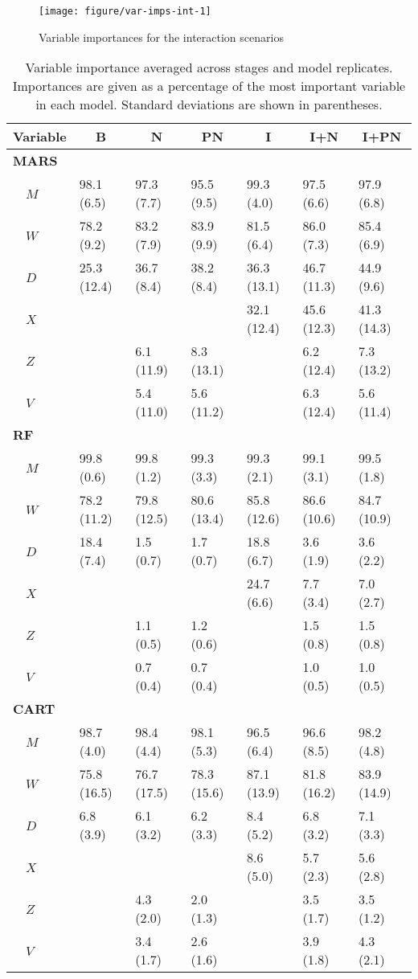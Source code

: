 \documentclass[12pt]{article}
\begin{document}
\begin{figure}[!htbp]
{\centering 
\texttt{[image: figure/var-imps-int-1]}
}
\caption[Variable importances for interaction scenarios]{Variable importances for the interaction scenarios}\label{fig:var-imps-int}
\end{figure}


\begin{table}[!htbp]
\caption[Variable importance averaged across stages and model replicates]{Variable importance averaged across stages and model replicates. Importances are given as a percentage of the most important variable in each model. Standard deviations are shown in parentheses.\label{tab:imp}} 
\begin{center}
\begin{tabular}{lllllll}
\toprule
\multicolumn{1}{l}{Variable}&\multicolumn{1}{c}{B}&\multicolumn{1}{c}{N}&\multicolumn{1}{c}{PN}&\multicolumn{1}{c}{I}&\multicolumn{1}{c}{I+N}&\multicolumn{1}{c}{I+PN}\tabularnewline
\midrule
{\bfseries MARS}&&&&&&\tabularnewline
~~$M$&98.1 (6.5)&97.3 (7.7)&95.5 (9.5)&99.3 (4.0)&97.5 (6.6)&97.9 (6.8)\tabularnewline
~~$W$&78.2 (9.2)&83.2 (7.9)&83.9 (9.9)&81.5 (6.4)&86.0 (7.3)&85.4 (6.9)\tabularnewline
~~$D$&25.3 (12.4)&36.7 (8.4)&38.2 (8.4)&36.3 (13.1)&46.7 (11.3)&44.9 (9.6)\tabularnewline
~~$X$&&&&32.1 (12.4)&45.6 (12.3)&41.3 (14.3)\tabularnewline
~~$Z$&&6.1 (11.9)&8.3 (13.1)&&6.2 (12.4)&7.3 (13.2)\tabularnewline
~~$V$&&5.4 (11.0)&5.6 (11.2)&&6.3 (12.4)&5.6 (11.4)\tabularnewline
\midrule
{\bfseries RF}&&&&&&\tabularnewline
~~$M$&99.8 (0.6)&99.8 (1.2)&99.3 (3.3)&99.3 (2.1)&99.1 (3.1)&99.5 (1.8)\tabularnewline
~~$W$&78.2 (11.2)&79.8 (12.5)&80.6 (13.4)&85.8 (12.6)&86.6 (10.6)&84.7 (10.9)\tabularnewline
~~$D$&18.4 (7.4)&1.5 (0.7)&1.7 (0.7)&18.8 (6.7)&3.6 (1.9)&3.6 (2.2)\tabularnewline
~~$X$&&&&24.7 (6.6)&7.7 (3.4)&7.0 (2.7)\tabularnewline
~~$Z$&&1.1 (0.5)&1.2 (0.6)&&1.5 (0.8)&1.5 (0.8)\tabularnewline
~~$V$&&0.7 (0.4)&0.7 (0.4)&&1.0 (0.5)&1.0 (0.5)\tabularnewline
\midrule
{\bfseries CART}&&&&&&\tabularnewline
~~$M$&98.7 (4.0)&98.4 (4.4)&98.1 (5.3)&96.5 (6.4)&96.6 (8.5)&98.2 (4.8)\tabularnewline
~~$W$&75.8 (16.5)&76.7 (17.5)&78.3 (15.6)&87.1 (13.9)&81.8 (16.2)&83.9 (14.9)\tabularnewline
~~$D$&6.8 (3.9)&6.1 (3.2)&6.2 (3.3)&8.4 (5.2)&6.8 (3.2)&7.1 (3.3)\tabularnewline
~~$X$&&&&8.6 (5.0)&5.7 (2.3)&5.6 (2.8)\tabularnewline
~~$Z$&&4.3 (2.0)&2.0 (1.3)&&3.5 (1.7)&3.5 (1.2)\tabularnewline
~~$V$&&3.4 (1.7)&2.6 (1.6)&&3.9 (1.8)&4.3 (2.1)\tabularnewline
\bottomrule
\end{tabular}\end{center}
\end{table}
\end{document}
